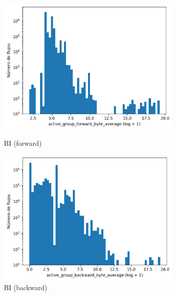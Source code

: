 \begin{figure}[H]
\begin{subfigure}[b]{0.26\textwidth}
        \includegraphics[width=\linewidth]{media/packet_pincer_botiot/active_group_forward_byte_average_log_x_log_y.png}
        \caption{BI (forward)}
        \includegraphics[width=\linewidth]{media/packet_pincer_botiot/active_group_backward_byte_average_log_x_log_y.png}
        \caption{BI (backward)}
    \end{subfigure}
    \hfill
    \begin{subfigure}[b]{0.26\textwidth}
        \centering

\end{subfigure}
\end{figure}
